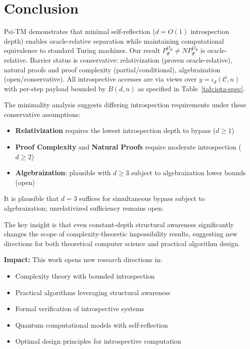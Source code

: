 \documentclass[11pt]{article}
\theoremstyle{plain}
\theoremstyle{definition}
\def\B(#1,#2){B(#1,#2)}
\begin{document}
\section{Conclusion}

Psi-TM demonstrates that minimal self-reflection ($d = O(1)$ introspection depth) enables oracle-relative separation while maintaining computational equivalence to standard Turing machines. Our result $P^{O_\Psi}_\Psi \neq NP^{O_\Psi}_\Psi$ is oracle-relative. Barrier status is conservative: relativization (proven oracle-relative), natural proofs and proof complexity (partial/conditional), algebraization (open/conservative). All introspective accesses are via views over $y=\iota_d(\mathcal{C},n)$ with per-step payload bounded by $\B(d,n)$ as specified in Table~\ref{tab:iota-spec}.

The minimality analysis suggests differing introspection requirements under these conservative assumptions:
\begin{itemize}
\item \textbf{Relativization} requires the lowest introspection depth to bypass ($d \geq 1$)
\item \textbf{Proof Complexity} and \textbf{Natural Proofs} require moderate introspection ($d \geq 2$)
\item \textbf{Algebraization}: plausible with $d \geq 3$ subject to algebraization lower bounds (open)
\end{itemize}

It is plausible that $d=3$ suffices for simultaneous bypass subject to algebraization; unrelativized sufficiency remains open.

The key insight is that even constant-depth structural awareness significantly changes the scope of complexity-theoretic impossibility results, suggesting new directions for both theoretical computer science and practical algorithm design.

\textbf{Impact:} This work opens new research directions in:
\begin{itemize}
\item Complexity theory with bounded introspection
\item Practical algorithms leveraging structural awareness
\item Formal verification of introspective systems
\item Quantum computational models with self-reflection
\item Optimal design principles for introspective computation
\end{itemize}

\nocite{*}


\end{document}
